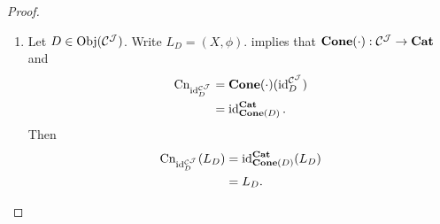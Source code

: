 \documentclass{book}
\begin{document}
\begin{proof}
\begin{enumerate}
\begin{enumerate}
\begin{itemize}
			\end{itemize}
			Therefore $\eta^L_{\be} \circ_{\MC} \eta^L_{\al} \in \Hom_{\MC}(X_1, X_3)$ and
			\begin{align*}
				\phi_3 \circ_{\MC^{\MJ}} \Del^{\MJ}(\eta^L_{\be} \circ_{\MC} \eta^L_{\al}) 
				& = \phi_3 \circ_{\MC^{\MJ}} [\Del^{\MJ}(\eta^L_{\be}) \circ_{\MC^{\MJ}} \Del^{\MJ}(\eta^L_{\al})] \\
				& = [\phi_3 \circ_{\MC^{\MJ}} \Del^{\MJ}(\eta^L_{\be})] \circ_{\MC^{\MJ}} \Del^{\MJ}(\eta^L_{\al}) \\
				& = [\be \circ_{\MC^{\MJ}} \phi_2] \circ_{\MC^{\MJ}} \Del^{\MJ}(\eta^L_{\al}) \\
				& = \be \circ_{\MC^{\MJ}} [\phi_2 \circ_{\MC^{\MJ}} \Del^{\MJ}(\eta^L_{\al}) ] \\
				& = \be \circ_{\MC^{\MJ}} [\al \circ_{\MC^{\MJ}} \phi_1] \\
				& = [\be \circ_{\MC^{\MJ}} \al] \circ_{\MC^{\MJ}} \phi_1.
			\end{align*}
			Hence 
			\begin{align*}
				\eta^L_{\be} \circ_{\MC} \eta^L_{\al} 
				& \in \Hom_{\bCone(D_3)}(X_1, (\be \circ_{\MC^{\MJ}} \al) \circ_{\MC^{\MJ}} \phi_1, (X_3, \phi_3)) \\
				& = \Hom_{\bCone(D_3)}(\Cn_{\be \circ_{\MC^{\MJ}} \al}(L_{D_1}), L_{D_3}) \\
				& = \{\eta^L_{\be \circ_{\MC^{\MJ}} \al}\}.
			\end{align*} 
			Thus 
			\begin{align*}
				\lim\limits_L(\be \circ_{\MC^{\MJ}} \al)
				& = \eta^L_{\be \circ_{\MC^{\MJ}} \al} \\
				& = \eta^L_{\be} \circ_{\MC} \eta^L_{\al} \\
				& = \lim\limits_L(\be) \circ_{\MC} \lim\limits_L(\al).
			\end{align*}
			\item Let $D \in \operatorname{Obj}(\mathcal{C}^{\mathcal{J}})$. Write $L_D = (X, \phi)$. \rex{}  implies that $\operatorname*{\text{\textbf{Cone}}}(\cdot): \mathcal{C}^{\mathcal{J}} \rightarrow \operatorname*{\text{\textbf{Cat}}}$ and 
			\begin{align*}
				\text{Cn}_{\operatorname{id}_D^{\mathcal{C}^{\mathcal{J}}}} 
				& = \operatorname*{\text{\textbf{Cone}}}(\cdot)(\operatorname{id}_D^{\mathcal{C}^{\mathcal{J}}}) \\
				& = \operatorname{id}_{\operatorname*{\text{\textbf{Cone}}}(D)}^{\operatorname*{\text{\textbf{Cat}}}}.
			\end{align*} 
			Then  
			\begin{align*}
				\text{Cn}_{\operatorname{id}_D^{\mathcal{C}^{\mathcal{J}}}}(L_D) 
				& = \operatorname{id}_{\operatorname*{\text{\textbf{Cone}}}(D)}^{\operatorname*{\text{\textbf{Cat}}}}(L_D) \\
				& = L_D.
			\end{align*}

\end{enumerate}
\end{enumerate}
\end{proof}
\end{document}
